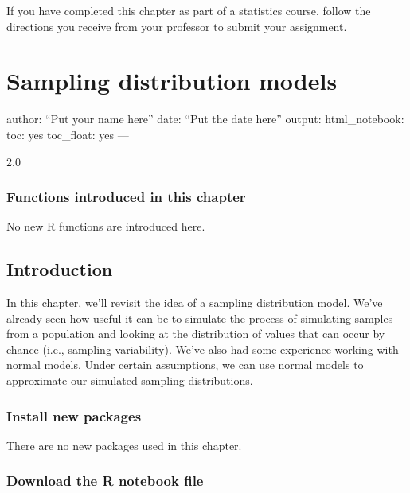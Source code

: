 \documentclass[
]{book}
\begin{document}
If you have completed this chapter as part of a statistics course, follow the directions you receive from your professor to submit your assignment.

\hypertarget{samp-dist-models}{%
\chapter{Sampling distribution models}\label{samp-dist-models}}

author: ``Put your name here''
date: ``Put the date here''
output:
html\_notebook:
toc: yes
toc\_float: yes
---

2.0

\hypertarget{functions-introduced-in-this-chapter-13}{%
\subsection*{Functions introduced in this chapter}\label{functions-introduced-in-this-chapter-13}}

No new R functions are introduced here.

\hypertarget{samp-dist-models-intro}{%
\section{Introduction}\label{samp-dist-models-intro}}

In this chapter, we'll revisit the idea of a sampling distribution model. We've already seen how useful it can be to simulate the process of simulating samples from a population and looking at the distribution of values that can occur by chance (i.e., sampling variability). We've also had some experience working with normal models. Under certain assumptions, we can use normal models to approximate our simulated sampling distributions.

\hypertarget{samp-dist-models-install}{%
\subsection{Install new packages}\label{samp-dist-models-install}}

There are no new packages used in this chapter.

\hypertarget{samp-dist-models-download}{%
\subsection{Download the R notebook file}\label{samp-dist-models-download}}
\end{document}
